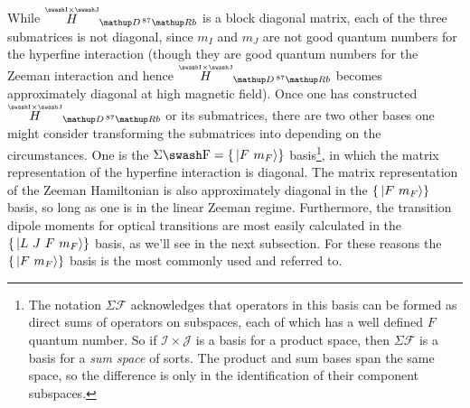 While $\oversetIJ H_{\up{D}\,^{87}\up{Rb}}$ is a block diagonal matrix, each of the three submatrices is not diagonal, since $m_I$ and $m_J$ are not good quantum numbers for the hyperfine interaction (though they are good quantum numbers for the Zeeman interaction and hence $\oversetIJ  H_{\up{D}\,^{87}\up{Rb}}$ becomes approximately diagonal at high magnetic field). Once one has constructed $\oversetIJ  H_{\up{D}\,^{87}\up{Rb}}$ or its submatrices, there are two other bases one might consider transforming the submatrices into depending on the circumstances. One is the $\Sigma\mathcal{F} = \{\ket{F\ m_F}\}$ basis\footnote{The notation $\Sigma\mathcal{F}$ acknowledges that operators in this basis can be formed as direct sums of operators on subspaces, each of which has a well defined $F$ quantum number. So if $\mathcal{I}\times\mathcal{J}$ is a basis for a product space, then $\Sigma \mathcal{F}$ is a basis for a \emph{sum space} of sorts. The product and sum bases span the same space, so the difference is only in the identification of their component subspaces.}, in which the matrix representation of the hyperfine interaction is diagonal. The matrix representation of the Zeeman Hamiltonian is also approximately diagonal in the $\{\ket{F\ m_F}\}$ basis, so long as one is in the linear Zeeman regime. Furthermore, the transition dipole moments for optical transitions are most easily calculated in the $\{\ket{L\ J\ F\ m_F}\}$ basis, as we'll see in the next subsection. For these reasons the $\{\ket{F\ m_F}\}$ basis is the most commonly used and referred to.

